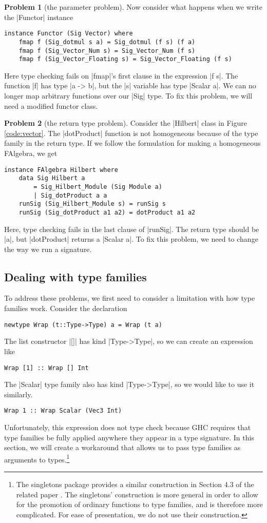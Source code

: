 \documentclass[preprint]{sigplanconf}
\theoremstyle{definition}
\newtheorem{problem}{Problem}
\begin{document}
\begin{problem}[the parameter problem]
Now consider what happens when we write the |Functor| instance
\begin{lstlisting}
instance Functor (Sig Vector) where
    fmap f (Sig_dotmul s a) = Sig_dotmul (f s) (f a)
    fmap f (Sig_Vector_Num s) = Sig_Vector_Num (f s)
    fmap f (Sig_Vector_Floating s) = Sig_Vector_Floating (f s)
\end{lstlisting}
Here type checking fails on |fmap|'s first clause in the expression |f s|.
The function |f| has type |a -> b|, but the |s| variable has type |Scalar a|.
We can no longer map arbitrary functions over our |Sig| type.
To fix this problem, we will need a modified functor class.
\end{problem}

\begin{problem}[the return type problem]
Consider the |Hilbert| class in Figure \ref{code:vector}.
The |dotProduct| function is not homogeneous because of the type family in the return type.
If we follow the formulation for making a homogeneous FAlgebra, we get
\begin{lstlisting}
instance FAlgebra Hilbert where
    data Sig Hilbert a
        = Sig_Hilbert_Module (Sig Module a)
        | Sig_dotProduct a a
    runSig (Sig_Hilbert_Module s) = runSig s
    runSig (Sig_dotProduct a1 a2) = dotProduct a1 a2
\end{lstlisting}
Here, type checking fails in the last clause of |runSig|.
The return type should be |a|,
but |dotProduct| returns a |Scalar a|.
To fix this problem, we need to change the way we run a signature.
\end{problem}

\subsection{Dealing with type families}
To address these problems, we first need to consider a limitation with how type families work.
Consider the declaration
\begin{lstlisting}
newtype Wrap (t::Type->Type) a = Wrap (t a)
\end{lstlisting}
The list constructor |[]| has kind |Type->Type|,
so we can create an expression like
\begin{lstlisting}
Wrap [1] :: Wrap [] Int
\end{lstlisting}
The |Scalar| type family also has kind |Type->Type|,
so we would like to use it similarly.
\begin{lstlisting}
Wrap 1 :: Wrap Scalar (Vec3 Int)
\end{lstlisting}
Unfortunately, this expression does not type check because GHC requires that type families be fully applied anywhere they appear in a type signature.
In this section, we will create a workaround that allows us to pass type families as arguments to types.\footnote{
    The {\ttfamily singletons} package provides a similar construction in Section 4.3 of the related paper \cite{eisenbarg2015promoting}.
    The {\ttfamily singletons}' construction is more general in order to allow for the promotion of ordinary functions to type families, and is therefore more complicated.
    For ease of presentation, we do not use their construction.
}
\end{document}
